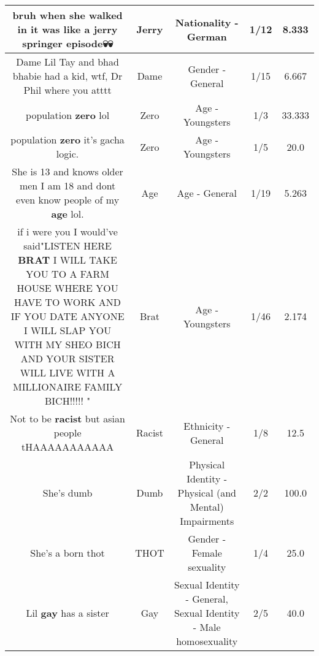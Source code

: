 \documentclass[11pt]{article}
\newlength\mylength
\begin{document}
\begin{center}
\begin{longtable}{|C{.65\mylength}|C{.30\mylength}|C{.12\mylength}|C{.12\mylength}|C{.12\mylength}|}
  \small bruh when she walked in it was like a \textbf{jerry} springer episode💀💀\normalsize   & Jerry & Nationality - German & 1/12 & 8.333 \\  \hline
  \small Dame Lil Tay and bhad bhabie had a kid, wtf, Dr Phil where you atttt\normalsize   & Dame & Gender - General & 1/15 & 6.667 \\  \hline
  \small population \textbf{zero} lol\normalsize   & Zero & Age - Youngsters & 1/3 & 33.333 \\  \hline
  \small population \textbf{zero} it's gacha logic.\normalsize   & Zero & Age - Youngsters & 1/5 & 20.0 \\  \hline
  \small She is 13 and knows older men I am 18 and dont even know people of my \textbf{age} lol.\normalsize   & Age & Age - General & 1/19 & 5.263 \\  \hline
  \small if i were you I would've said"LISTEN HERE \textbf{BRAT} I WILL  TAKE YOU TO A FARM HOUSE WHERE YOU HAVE TO WORK AND IF YOU DATE ANYONE I WILL SLAP YOU WITH MY SHEO BICH AND YOUR SISTER WILL LIVE WITH A MILLIONAIRE FAMILY BICH!!!!! "\normalsize   & Brat & Age - Youngsters & 1/46 & 2.174 \\  \hline
  \small Not to be \textbf{racist} but asian people tHAAAAAAAAAAA\normalsize   & Racist & Ethnicity - General & 1/8 & 12.5 \\  \hline
  \small She's dumb\normalsize   & Dumb & Physical Identity - Physical (and Mental) Impairments & 2/2 & 100.0 \\  \hline
  \small She's a born thot\normalsize   & THOT & Gender - Female sexuality & 1/4 & 25.0 \\  \hline
  \small Lil \textbf{g\textbf{ay}} has a sister\normalsize   & Gay & Sexual Identity - General, Sexual Identity - Male homosexuality & 2/5 & 40.0 \\  \hline

\end{longtable}
\end{center}
\end{document}
